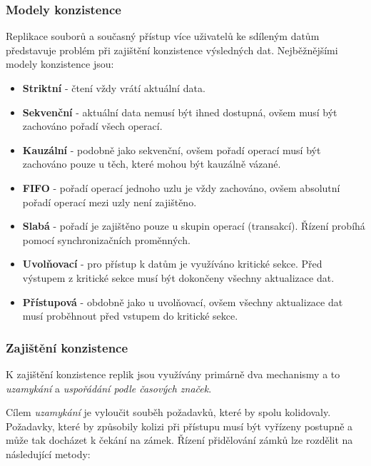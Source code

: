 \documentclass[czech,DP]{thesiskiv}
\begin{document}
\subsubsection*{Modely konzistence}

Replikace souborů a současný přístup více uživatelů ke sdíleným datům představuje problém při zajištění konzistence výsledných dat. Nejběžnějšími modely konzistence jsou:

\begin{itemize}
\item \textbf{Striktní} - čtení vždy vrátí aktuální data.
\item \textbf{Sekvenční} - aktuální data nemusí být ihned dostupná, ovšem musí být zachováno pořadí všech operací.
\item \textbf{Kauzální} - podobně jako sekvenční, ovšem pořadí operací musí být zachováno pouze u těch, které mohou být kauzálně vázané.
\item \textbf{FIFO} - pořadí operací jednoho uzlu je vždy zachováno, ovšem absolutní pořadí operací mezi uzly není zajištěno.
\item \textbf{Slabá} - pořadí je zajištěno pouze u skupin operací (transakcí). Řízení probíhá pomocí synchronizačních proměnných.
\item \textbf{Uvolňovací} - pro přístup k datům je využíváno kritické sekce. Před výstupem z kritické sekce musí být dokončeny všechny aktualizace dat.
\item \textbf{Přístupová} - obdobně jako u uvolňovací, ovšem všechny aktualizace dat musí proběhnout před vstupem do kritické sekce.
\end{itemize}

\subsubsection*{Zajištění konzistence}

K zajištění konzistence replik jsou využívány primárně dva mechanismy a to \textit{uzamykání} a \textit{uspořádání podle časových značek}.

Cílem \textit{uzamykání} je vyloučit souběh požadavků, které by spolu kolidovaly. Požadavky, které by způsobily kolizi při přístupu musí být vyřízeny postupně a může tak docházet k čekání na zámek. Řízení přidělování zámků lze rozdělit na následující metody:
\end{document}
